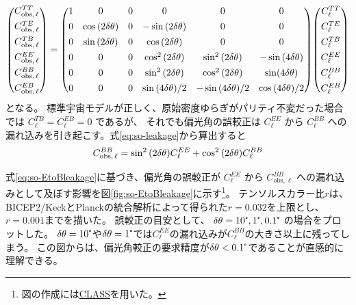 \documentclass[../../main.tex]{subfiles}
\begin{document}
\begin{equation}
    \label{eq:so-leakage}
    \mqty( C_{\mathrm{obs},\,\ell}^{TT} \\[1ex]
           C_{\mathrm{obs},\,\ell}^{TE} \\[1ex]
           C_{\mathrm{obs},\,\ell}^{TB} \\[1ex]
           C_{\mathrm{obs},\,\ell}^{EE} \\[1ex]
           C_{\mathrm{obs},\,\ell}^{BB} \\[1ex]
           C_{\mathrm{obs},\,\ell}^{EB} )
    = \mqty( 1 & 0 & 0 & 0 & 0 & 0 \\[1ex]
             0 & \cos\qty(2\delta\theta) & 0 & -\sin\qty(2\delta\theta) & 0 & 0 \\[1ex]
             0 & \sin\qty(2\delta\theta) & 0 & \cos\qty(2\delta\theta) & 0 & 0 \\[1ex]
             0 & 0 & 0 & \cos^2\qty(2\delta\theta) & \sin^2\qty(2\delta\theta) & -\sin\qty(4\delta\theta) \\[1ex]
             0 & 0 & 0 & \sin^2\qty(2\delta\theta) & \cos^2\qty(2\delta\theta) & \sin(4\delta\theta) \\[1ex]
             0 & 0 & 0 & \sin\qty(4\delta\theta)/2 & -\sin\qty(4\delta\theta)/2 & \cos\qty(4\delta\theta)/2 )
    \mqty( C_{\ell}^{TT} \\[1ex]
              C_{\ell}^{TE} \\[1ex]
              C_{\ell}^{TB} \\[1ex]
              C_{\ell}^{EE} \\[1ex]
              C_{\ell}^{BB} \\[1ex]
              C_{\ell}^{EB} )
\end{equation}
となる。
標準宇宙モデルが正しく、原始密度ゆらぎがパリティ不変だった場合では $C_{\ell}^{TB}=C_{\ell}^{EB}=0$ であるが、
それでも偏光角の誤較正は $C_{\ell}^{EE}$ から $C_{\ell}^{BB}$ への漏れ込みを引き起こす。式\eqref{eq:so-leakage}から算出すると
\begin{equation}
    \label{eq:so-EtoBleakage}
    C_{\mathrm{obs},\,\ell}^{BB} = \sin^2\qty(2\delta\theta)C_{\ell}^{EE} + \cos^2\qty(2\delta\theta)C_{\ell}^{BB}
\end{equation}

式\eqref{eq:so-EtoBleakage}に基づき、偏光角の誤較正が $C_{\ell}^{EE}$ から 
$C_{\mathrm{obs}, \ell}^{BB}$ への漏れ込みとして及ぼす影響を図\ref{fig:so-EtoBleakage}に示す\footnote{図の作成には\href{http://class-code.net}{CLASS}を用いた。}。
テンソルスカラー比$r$は、BICEP2/KeckとPlanckの統合解析によって得られた$r=0.032$を上限とし、$r=0.001$までを描いた。
誤較正の目安として、 $\delta\theta = 10\tcdegree, 1\tcdegree, 0.1\tcdegree$ の場合をプロットした。
$\delta\theta=10\tcdegree$や$\delta\theta=1\tcdegree$では$C_{\ell}^{EE}$の漏れ込みが$C_{\ell}^{BB}$の大きさ以上に残ってしまう。
この図からは、偏光角較正の要求精度が$\delta\theta < 0.1\tcdegree$であることが直感的に理解できる。
\end{document}
